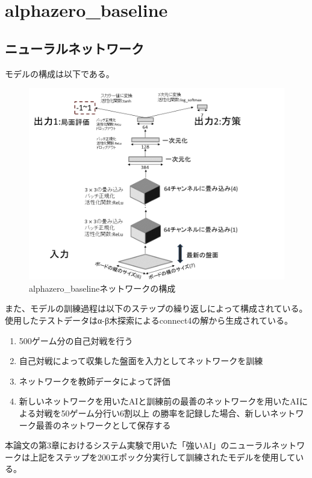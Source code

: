 \chapter{alphazero\_baseline}
\section{ニューラルネットワーク}
モデルの構成は以下である。
\begin{figure}[t]
	\centering
	\includegraphics[width=\linewidth]{./figure/baselineNetwork.png}
	\caption{alphazero\_baselineネットワークの構成}
	\label{fig:baselineNetwork}
\end{figure}
また、モデルの訓練過程は以下のステップの繰り返しによって構成されている。
使用したテストデータ\cite{dataset}はα-β木探索によるconnect4の解から生成されている\cite{scoring}。
\begin{enumerate}
	\item 500ゲーム分の自己対戦を行う
	\item 自己対戦によって収集した盤面を入力としてネットワークを訓練
    \item ネットワークを教師データによって評価
    \item 新しいネットワークを用いたAIと訓練前の最善のネットワークを用いたAIによる対戦を50ゲーム分行い6割以上
    の勝率を記録した場合、新しいネットワーク最善のネットワークとして保存する

\end{enumerate}
本論文の第3章におけるシステム実験で用いた「強いAI」のニューラルネットワークは上記をステップを200エポック分実行して訓練されたモデルを使用している。

